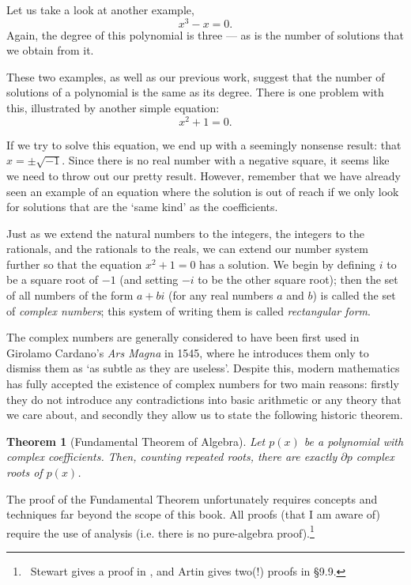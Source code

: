 \documentclass[a4paper,10pt,titlepage]{article}
\newtheorem*{thm}{Theorem}
\theoremstyle{definition}
\begin{document}
Let us take a look at another example,
\begin{displaymath}
  x^3 - x = 0.
\end{displaymath}
Again, the degree of this polynomial is three --- as is the number of solutions that we obtain from it.

These two examples, as well as our previous work, suggest that the number of solutions of a polynomial is the same as its degree. There
is one problem with this, illustrated by another simple equation:
\begin{displaymath}
  x^2 + 1 = 0.
\end{displaymath}

If we try to solve this equation, we end up with a seemingly nonsense result: that $ x = \pm \sqrt{-1} $. Since there is no real
number with a negative square, it seems like we need to throw out our pretty result. However, remember that we have already seen
an example of an equation where the solution is out of reach if we only look for solutions that are the `same kind' as the coefficients.

Just as we extend the natural numbers to the integers, the integers to the rationals, and the rationals to the reals, we can
extend our number system further so that the equation $ x^2 + 1 = 0 $ has a solution. We begin by defining $ i $ to be a square
root of $ -1 $ (and setting $ -i $ to be the other square root); then the set of all numbers of the form $ a + bi $ (for any real
numbers $ a $ and $ b $) is called the set of \emph{complex numbers}; this system of writing them is called \emph{rectangular form}.

The complex numbers are generally considered to have been first used in Girolamo Cardano's \emph{Ars Magna} in 1545, where he
introduces them only to dismiss them as `as subtle as they are useless'. Despite this, modern mathematics has fully accepted the
existence of complex numbers for two main reasons: firstly they do not introduce any contradictions into basic arithmetic or
any theory that we care about, and secondly they allow us to state the following historic theorem.

\begin{thm}[Fundamental Theorem of Algebra]
  Let $ p(x) $ be a polynomial with complex coefficients. Then, counting repeated roots, there are exactly $ \partial p $ complex roots of $ p(x) $.
\end{thm}

The proof of the Fundamental Theorem unfortunately requires concepts and techniques far beyond the scope of this book. All proofs (that I am aware of) require
the use of analysis (i.e. there is no pure-algebra proof).\footnote{~Stewart gives a proof in \cite{Ste15}, and Artin gives two(!) proofs in \cite{Art91} \S 9.9.}
\end{document}
